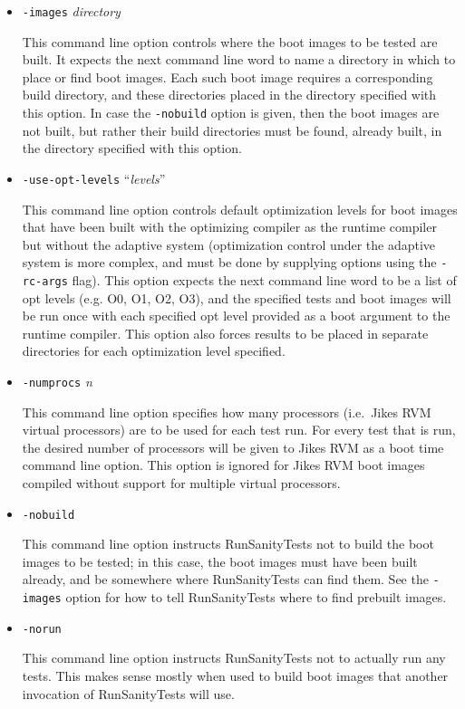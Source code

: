 \begin{itemize}
\item{\tt{-images}} {\em directory}

 This command line option controls where the boot images to be tested
are built. It expects the next command line word to name a directory
in which to place or find boot images. Each such boot image requires a
corresponding build directory, and these directories placed in the
directory specified with this option.  In case the {\tt -nobuild}
option is given, then the boot images are not built, but rather their
build directories must be found, already built, in the directory
specified with this option.

\item{\tt{-use-opt-levels}} ``{\em levels}''

 This command line option controls default optimization levels for
boot images that have been built with the optimizing compiler as the
runtime compiler but without the adaptive system (optimization control
under the adaptive system is more complex, and must be done by
supplying options using the {\tt -rc-args} flag).  This option expects
the next command line word to be a list of opt levels (e.g. O0, O1,
O2, O3), and the specified tests and boot images will be run once with
each specified opt level provided as a boot argument to the runtime
compiler.  This option also forces results to be placed in separate
directories for each optimization level specified.

\item{\tt{-numprocs}} {\em n}

 This command line option specifies how many processors (i.e.\ Jikes\trademark
RVM virtual processors) are to be used for each test run.  For every
test that is run, the desired number of processors will be given to
Jikes RVM as a boot time command line option.  This option is ignored
for Jikes RVM boot images compiled without support for multiple
virtual processors.

\item{\tt{-nobuild}}

 This command line option instructs RunSanityTests not to build the
boot images to be tested; in this case, the boot images must have been
built already, and be somewhere where RunSanityTests can find them.
See the {\tt -images} option for how to tell RunSanityTests where to
find prebuilt images.

\item{\tt{-norun}}

 This command line option instructs RunSanityTests not to actually run
any tests.  This makes sense mostly when used to build boot images
that another invocation of RunSanityTests will use.


\end{itemize}
